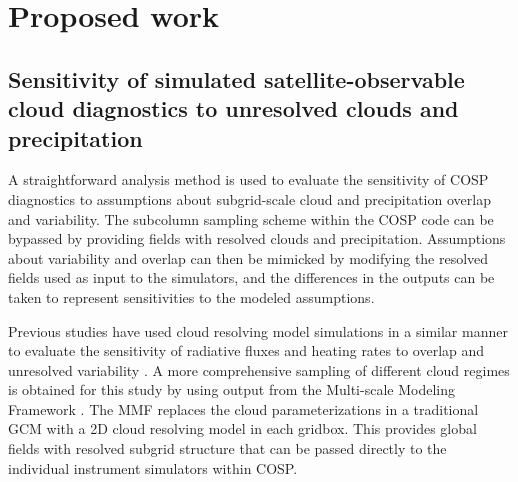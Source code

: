 \documentclass[letter]{article}
\begin{document}
\section{Proposed work}

\subsection{Sensitivity of simulated satellite-observable cloud diagnostics to unresolved clouds and precipitation}
A straightforward analysis method is used to evaluate the sensitivity of COSP diagnostics to assumptions about subgrid-scale cloud and precipitation overlap and variability. The subcolumn sampling scheme within the COSP code can be bypassed by providing fields with resolved clouds and precipitation. Assumptions about variability and overlap can then be mimicked by modifying the resolved fields used as input to the simulators, and the differences in the outputs can be taken to represent sensitivities to the modeled assumptions.

Previous studies have used cloud resolving model simulations in a similar manner to evaluate the sensitivity of radiative fluxes and heating rates to overlap and unresolved variability \citep[e.g.][]{barker_et_al_1999,wu_and_liang_2005}. A more comprehensive sampling of different cloud regimes is obtained for this study by using output from the Multi-scale Modeling Framework \citep[MMF;][]{khairoutdinov_and_randall_2001,randall_et_al_2003}. The MMF replaces the cloud parameterizations in a traditional GCM with a 2D cloud resolving model in each gridbox. This provides global fields with resolved subgrid structure that can be passed directly to the individual instrument simulators within COSP.
\end{document}
